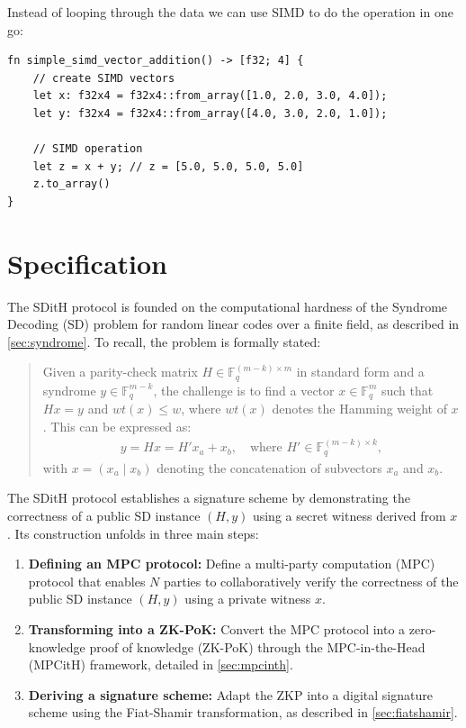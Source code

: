 \documentclass[11pt]{report}
\theoremstyle{definition}
\theoremstyle{plain}
\begin{document}
Instead of looping through the data we can use SIMD to do the operation in one go:

\begin{verbatim}
fn simple_simd_vector_addition() -> [f32; 4] {
    // create SIMD vectors
    let x: f32x4 = f32x4::from_array([1.0, 2.0, 3.0, 4.0]);
    let y: f32x4 = f32x4::from_array([4.0, 3.0, 2.0, 1.0]);

    // SIMD operation
    let z = x + y; // z = [5.0, 5.0, 5.0, 5.0]
    z.to_array() 
}
\end{verbatim}

\chapter{Specification}\label{ch:spec}

The SDitH protocol is founded on the computational hardness of the Syndrome Decoding (SD) problem for random linear codes over a finite field, as described in \autoref{sec:syndrome}. To recall, the problem is formally stated:
\begin{quote}
  Given a parity-check matrix $H \in \mathbb{F}_q^{(m-k) \times m}$ in standard form and a syndrome $y \in \mathbb{F}_q^{m-k}$, the challenge is to find a vector $x \in \mathbb{F}_q^m$ such that $Hx = y$ and $wt(x) \leq w$, where $wt(x)$ denotes the Hamming weight of $x$. This can be expressed as:
  \begin{align*}
    y = Hx = H'x_a + x_b, \quad \text{where } H' \in \mathbb{F}_q^{(m-k) \times k},
  \end{align*}
  with $x = (x_a \mid x_b)$ denoting the concatenation of subvectors $x_a$ and $x_b$.
\end{quote}

The SDitH protocol establishes a signature scheme by demonstrating the correctness of a public SD instance $(H, y)$ using a secret witness derived from $x$. Its construction unfolds in three main steps:
\begin{enumerate}
  \item \textbf{Defining an MPC protocol:} Define a multi-party computation (MPC) protocol that enables $N$ parties to collaboratively verify the correctness of the public SD instance $(H, y)$ using a private witness $x$.
  \item \textbf{Transforming into a ZK-PoK:} Convert the MPC protocol into a zero-knowledge proof of knowledge (ZK-PoK) through the MPC-in-the-Head (MPCitH) framework, detailed in \autoref{sec:mpcinth}.
  \item \textbf{Deriving a signature scheme:} Adapt the ZKP into a digital signature scheme using the Fiat-Shamir transformation, as described in \autoref{sec:fiatshamir}.
\end{enumerate}
\end{document}
